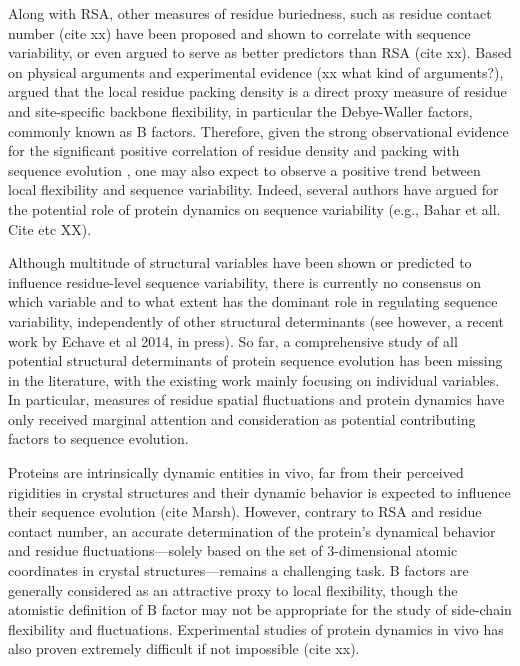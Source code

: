 \documentclass[12pt]{article}
\begin{document}
Along with RSA, other measures of residue buriedness, such as residue contact number (cite xx) have been proposed and shown to correlate with sequence variability, or even argued to serve as better predictors than RSA (cite xx).  Based on physical arguments and experimental evidence (xx what kind of arguments?), \citet{Halle2002} argued that the local residue packing density is a direct proxy measure of residue and site-specific backbone flexibility, in particular the Debye-Waller factors, commonly known as B factors. Therefore, given the strong observational evidence for the significant positive correlation of residue density and packing with sequence evolution \citep{Yehetal2014}, one may also expect to observe a positive trend between local flexibility and sequence variability. Indeed, several authors have argued for the potential role of protein dynamics on sequence variability (e.g., Bahar et all. Cite etc XX).
	
Although multitude of structural variables have been shown or predicted to influence residue-level sequence variability, there is currently no consensus on which variable and to what extent has the dominant role in regulating sequence variability, independently of other structural determinants (see however, a recent work by Echave et al 2014, in press). So far, a comprehensive study of all potential structural determinants of protein sequence evolution has been missing in the literature, with the existing work mainly focusing on individual variables. In particular, measures of residue spatial fluctuations and protein dynamics have only received marginal attention and consideration as potential contributing factors to sequence evolution.

Proteins are intrinsically dynamic entities in vivo, far from their perceived rigidities in crystal structures and their dynamic behavior is expected to influence their sequence evolution (cite Marsh).  However, contrary to RSA and residue contact number, an accurate determination of the protein's dynamical behavior and residue fluctuations---solely based on the set of 3-dimensional atomic coordinates in crystal structures---remains a challenging task. B factors are generally considered as an attractive proxy to local flexibility, though the atomistic definition of B factor may not be appropriate for the study of side-chain flexibility and fluctuations. Experimental studies of protein dynamics in vivo has also proven extremely difficult if not impossible (cite xx).
\end{document}
